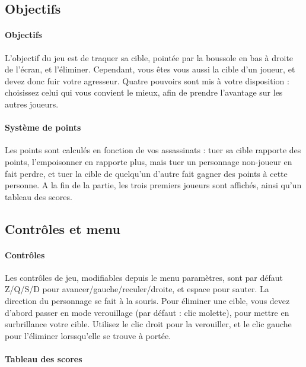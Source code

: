 \subsection{Objectifs}

    \paragraph{Objectifs}

        L'objectif du jeu est de traquer sa cible, pointée par la boussole en bas à droite de l'écran, et l'éliminer. Cependant, 
        vous êtes vous aussi la cible d'un joueur, et devez donc fuir votre agresseur. Quatre pouvoirs sont mis à votre disposition : 
        choisissez celui qui vous convient le mieux, afin de prendre l'avantage sur les autres joueurs.


    \paragraph{Système de points}

        Les points sont calculés en fonction de vos assassinats : tuer sa cible rapporte des points, l'empoisonner en rapporte plus, 
        mais tuer un personnage non-joueur en fait perdre, et tuer la cible de quelqu'un d'autre fait gagner des points à cette personne. 
        A la fin de la partie, les trois premiers joueurs sont affichés, ainsi qu'un tableau des scores.
            
        
\subsection{Contrôles et menu}


    \paragraph{Contrôles}

        Les contrôles de jeu, modifiables depuis le menu paramètres, sont par défaut Z/Q/S/D pour 
        avancer/gauche/reculer/droite, et espace pour sauter. La direction du personnage se fait à la souris. 
        Pour éliminer une cible, vous devez d'abord passer en mode verouillage (par défaut : clic molette), pour mettre en surbrillance 
        votre cible. Utilisez le clic droit pour la verouiller, et le clic gauche pour l'éliminer lorssqu'elle se trouve à portée.


    \paragraph{Tableau des scores}

